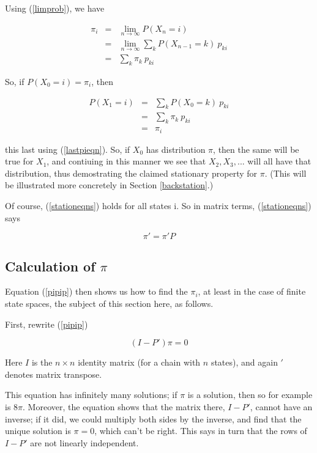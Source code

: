 Using (\ref{limprob}), we have

\begin{eqnarray}
\label{stationeqns}
\pi_i 
&=& \lim_{n \rightarrow \infty} P(X_{n} = i)  \\
&=& \lim_{n \rightarrow \infty} \sum_k P(X_{n-1} = k) ~ p_{ki} \\ 
&=& \sum_k \pi_k ~ p_{ki} \label{lastpieqn} 
\end{eqnarray}

So, if $P(X_0 = i) = \pi_i$, then

\begin{eqnarray}
P(X_1 = i) 
&=& \sum_k P(X_{0} = k) ~ p_{ki} \\
&=& \sum_k \pi_k ~ p_{ki} \\
&=& \pi_i \label{piderive}
\end{eqnarray}

this last using (\ref{lastpieqn}).  So, if $X_0$ has distribution $\pi$,
then the same will be true for $X_1$, and contiuing in this manner we
see that $X_2, X_3,...$ will all have that distribution, thus
demostrating the claimed stationary property for $\pi$.  (This will be
illustrated more concretely in Section \ref{backstation}.)

Of course, (\ref{stationeqns}) holds for all states i.  So
in matrix terms, (\ref{stationeqns}) says

\begin{equation}
\label{pipip}
\pi' =  \pi' P
\end{equation}

\subsection{Calculation of $\pi$} 

Equation (\ref{pipip}) then shows us how to find the $\pi_i$, at least
in the case of finite state spaces, the subject of this section here, as
follows.

First, rewrite (\ref{pipip})

\begin{equation}
\label{iminuspi} 
(I-P') \pi = 0
\end{equation}

Here $I$ is the $n \times n$ identity matrix (for a chain with $n$
states), and again $'$ denotes matrix transpose.  

This equation has infinitely many solutions; if $\pi$ is a solution,
then so for example is $8 \pi$.  Moreover, the equation shows that the
matrix there, $I - P'$, cannot have an inverse; if it did, we could
multiply both sides by the inverse, and find that the unique solution is
$\pi = 0$, which can't be right.  This says in turn that the rows of $I
- P'$ are not linearly independent.  

